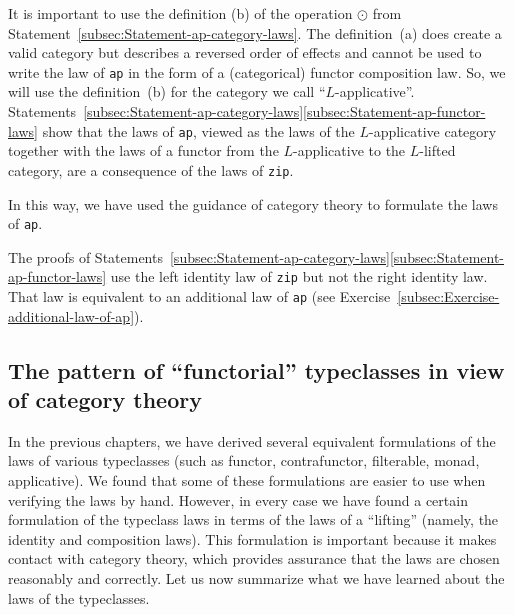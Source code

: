 It is important to use the definition (b) of the operation $\odot$
from Statement~\ref{subsec:Statement-ap-category-laws}. The definition~(a)
does create a valid category but describes a reversed order of effects
and cannot be used to write the law of \lstinline!ap! in the form
of a (categorical) functor composition law. So, we will use the definition~(b)
for the category we call \textsf{``}$L$-applicative\textsf{''}. Statements~\ref{subsec:Statement-ap-category-laws}\textendash \ref{subsec:Statement-ap-functor-laws}
show that the laws of \lstinline!ap!, viewed as the laws of the $L$-applicative
category together with the laws of a functor from the $L$-applicative
to the $L$-lifted category, are a consequence of the laws of \lstinline!zip!.

In this way, we have used the guidance of category theory to formulate
the laws of \lstinline!ap!.

The proofs of Statements~\ref{subsec:Statement-ap-category-laws}\textendash \ref{subsec:Statement-ap-functor-laws}
use the left identity law of \lstinline!zip! but not the right identity
law. That law is equivalent to an additional law of \lstinline!ap!
(see Exercise~\ref{subsec:Exercise-additional-law-of-ap}).

\subsection{The pattern of \textquotedblleft functorial\textquotedblright{} typeclasses
in view of category theory\label{subsec:The-pattern-of-functorial-typeclasses}}

In the previous chapters, we have derived several equivalent formulations
of the laws of various typeclasses (such as functor, contrafunctor,
filterable, monad, applicative). We found that some of these formulations
are easier to use when verifying the laws by hand. However, in every
case we have found a certain formulation of the typeclass laws in
terms of the laws of a \textsf{``}lifting\textsf{''} (namely, the identity and composition
laws). This formulation is important because it makes contact with
category theory, which provides assurance that the laws are chosen
reasonably and correctly. Let us now summarize what we have learned
about the laws of the typeclasses.

